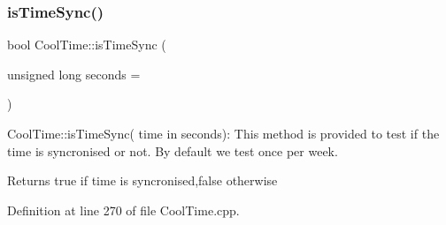 \mbox{\label{class_cool_time_a5ae038a4498602b189f76a10bf02adf8}} 
\subsubsection{\texorpdfstring{is\+Time\+Sync()}{isTimeSync()}}
{\footnotesize\ttfamily bool Cool\+Time\+::is\+Time\+Sync (\begin{DoxyParamCaption}\item[{unsigned long}]{seconds = {} }\end{DoxyParamCaption})}

Cool\+Time\+::is\+Time\+Sync( time in seconds)\+: This method is provided to test if the time is syncronised or not. By default we test once per week.

\begin{DoxyReturn}{Returns}
true if time is syncronised,false otherwise 
\end{DoxyReturn}


Definition at line 270 of file Cool\+Time.\+cpp.


